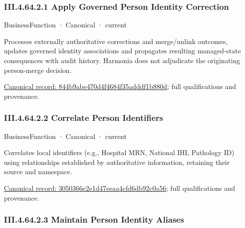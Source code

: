 \subsubsection*{III.4.64.2.1 Apply Governed Person Identity Correction}
\label{navigation:III.4.64.2.1}

\label{element:844b9abe470d4f4684f35adddf1b880d}
{\small BusinessFunction · Canonical · current}\par

Processes externally authoritative corrections and merge/unlink outcomes, updates governed identity associations and propagates resulting managed-state consequences with audit history. Harmonia does not adjudicate the originating person-merge decision.


{\footnotesize \href{../../../../continuum/business/business-function/844b9abe470d4f4684f35adddf1b880d.md}{Canonical record: 844b9abe470d4f4684f35adddf1b880d}; full qualifications and provenance.}\par
\subsubsection*{III.4.64.2.2 Correlate Person Identifiers}
\label{navigation:III.4.64.2.2}

\label{element:3050366e2e1d47eeaa4cfd6db92c0a56}
{\small BusinessFunction · Canonical · current}\par

Correlates local identifiers (e.g., Hospital MRN, National IHI, Pathology ID) using relationships established by authoritative information, retaining their source and namespace.


{\footnotesize \href{../../../../continuum/business/business-function/3050366e2e1d47eeaa4cfd6db92c0a56.md}{Canonical record: 3050366e2e1d47eeaa4cfd6db92c0a56}; full qualifications and provenance.}\par
\subsubsection*{III.4.64.2.3 Maintain Person Identity Aliases}
\label{navigation:III.4.64.2.3}

